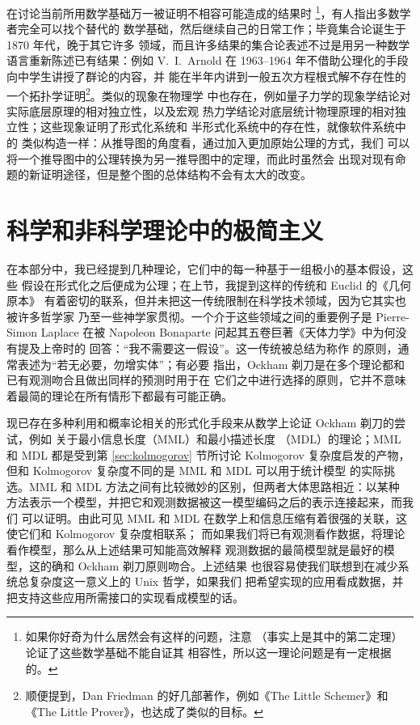 在讨论当前所用数学基础万一被证明不相容可能造成的结果时%
\footnote{如果你好奇为什么居然会有这样的问题，注意 %
（事实上是其中的第二定理）论证了这些数学基础不能自证其
相容性，所以这一理论问题是有一定根据的。}，有人指出多数学者完全可以找个替代的
数学基础，然后继续自己的日常工作；毕竟集合论诞生于 1870 年代，晚于其它许多
领域，而且许多结果的集合论表述不过是用另一种数学语言重新陈述已有结果：例如
V.~I.\ Arnold 在 1963--1964 年不借助公理化的手段向中学生讲授了群论的内容，并
能在半年内讲到一般五次方程根式解不存在性的一个拓扑学证明\footnote{顺便提到，Dan Friedman 的好几部著作，例如《The Little
Schemer》和《The Little Prover》，也达成了类似的目标。}。类似的现象在物理学
中也存在，例如量子力学的现象学结论对实际底层原理的相对独立性，以及宏观
热力学结论对底层统计物理原理的相对独立性；这些现象证明了形式化系统和
半形式化系统中的存在性，就像软件系统中的
类似构造一样：从推导图的角度看，通过加入更加原始公理的方式，我们
可以将一个推导图中的公理转换为另一推导图中的定理，而此时虽然会
出现对现有命题的新证明途径，但是整个图的总体结构不会有太大的改变。

\section{科学和非科学理论中的极简主义}\label{sec:ockham}

在本部分中，我已经提到几种理论，它们中的每一种基于一组极小的基本假设，这些
假设在形式化之后便成为公理；在上节，我提到这样的传统和 Euclid 的《几何原本》
有着密切的联系，但并未把这一传统限制在科学技术领域，因为它其实也被许多哲学家
乃至一些神学家贯彻。一个介于这些领域之间的重要例子是 Pierre-Simon Laplace
在被 Napoleon Bonaparte 问起其五卷巨著《天体力学》中为何没有提及上帝时的
回答：“我不需要这一假设”。这一传统被总结为称作 %
的原则，通常表述为“若无必要，勿增实体”；有必要
指出，Ockham 剃刀是在多个理论都和已有观测吻合且做出同样的预测时用于在
它们之中进行选择的原则，它并不意味着最简的理论在所有情形下都最有可能正确。

现已存在多种利用和概率论相关的形式化手段来从数学上论证 Ockham 剃刀的尝试，例如
关于最小信息长度（MML）和最小描述长度%
（MDL）的理论；MML 和 MDL 都是受到第 \ref{sec:kolmogorov} 节所讨论 Kolmogorov
复杂度启发的产物，但和 Kolmogorov 复杂度不同的是 MML 和 MDL 可以用于统计模型
的实际挑选。MML 和 MDL 方法之间有比较微妙的区别，但两者大体思路相近：以某种
方法表示一个模型，并把它和观测数据被这一模型编码之后的表示连接起来，而我们
可以证明。由此可见 MML 和
MDL 在数学上和信息压缩有着很强的关联，这使它们和 Kolmogorov 复杂度相联系；
而如果我们将已有观测看作数据，将理论看作模型，那么从上述结果可知能高效解释
观测数据的最简模型就是最好的模型，这的确和 Ockham 剃刀原则吻合。上述结果
也很容易使我们联想到在减少系统总复杂度这一意义上的 Unix 哲学，如果我们
把希望实现的应用看成数据，并把支持这些应用所需接口的实现看成模型的话。

